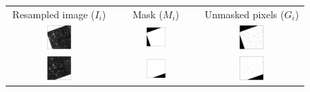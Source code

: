 \documentclass[11pt,preprint]{aastex}
\newcommand{\fimg}[1]{#1}
\newcommand{\img}{\fimg{I}}
\newcommand{\mask}{\fimg{M}}
\newcommand{\good}{\fimg{G}}
\begin{document}
%
\begin{figure}
\begin{center}
\begin{tabular}{@{}ccc@{}}
Resampled image ($\img_i$) &
Mask ($\mask_i$) &
Unmasked pixels ($\good_i$) \\
\includegraphics[width=0.25\textwidth]{plots1/sequels-009} &
\includegraphics[width=0.25\textwidth]{plots1/sequels-010} &
\includegraphics[width=0.25\textwidth]{plots1/sequels-011} \\
\includegraphics[width=0.25\textwidth]{plots1/sequels-015} &
\includegraphics[width=0.25\textwidth]{plots1/sequels-016} &
\includegraphics[width=0.25\textwidth]{plots1/sequels-017}

\end{tabular}
\end{center}
\end{figure}
\end{document}
